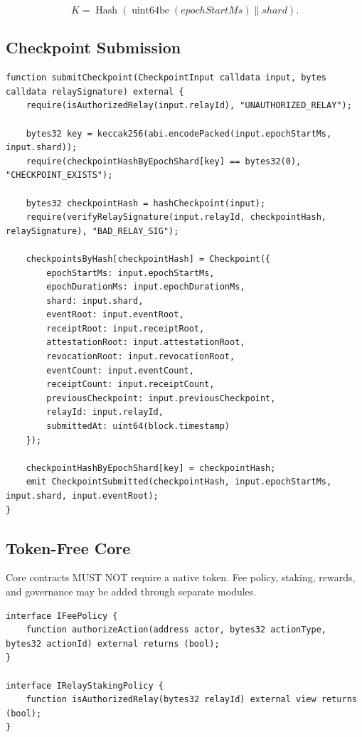 \documentclass[11pt]{article}
\newcommand{\hash}{\operatorname{Hash}}
\begin{document}
\begin{equation}
K = \hash(\operatorname{uint64be}(epochStartMs) \parallel shard).
\end{equation}

\subsection{Checkpoint Submission}

\begin{lstlisting}[style=tslcode]
function submitCheckpoint(CheckpointInput calldata input, bytes calldata relaySignature) external {
    require(isAuthorizedRelay(input.relayId), "UNAUTHORIZED_RELAY");

    bytes32 key = keccak256(abi.encodePacked(input.epochStartMs, input.shard));
    require(checkpointHashByEpochShard[key] == bytes32(0), "CHECKPOINT_EXISTS");

    bytes32 checkpointHash = hashCheckpoint(input);
    require(verifyRelaySignature(input.relayId, checkpointHash, relaySignature), "BAD_RELAY_SIG");

    checkpointsByHash[checkpointHash] = Checkpoint({
        epochStartMs: input.epochStartMs,
        epochDurationMs: input.epochDurationMs,
        shard: input.shard,
        eventRoot: input.eventRoot,
        receiptRoot: input.receiptRoot,
        attestationRoot: input.attestationRoot,
        revocationRoot: input.revocationRoot,
        eventCount: input.eventCount,
        receiptCount: input.receiptCount,
        previousCheckpoint: input.previousCheckpoint,
        relayId: input.relayId,
        submittedAt: uint64(block.timestamp)
    });

    checkpointHashByEpochShard[key] = checkpointHash;
    emit CheckpointSubmitted(checkpointHash, input.epochStartMs, input.shard, input.eventRoot);
}
\end{lstlisting}

\subsection{Token-Free Core}

Core contracts MUST NOT require a native token. Fee policy, staking, rewards, and governance may be added through separate modules.

\begin{lstlisting}[style=tslcode]
interface IFeePolicy {
    function authorizeAction(address actor, bytes32 actionType, bytes32 actionId) external returns (bool);
}

interface IRelayStakingPolicy {
    function isAuthorizedRelay(bytes32 relayId) external view returns (bool);
}
\end{lstlisting}
\end{document}
